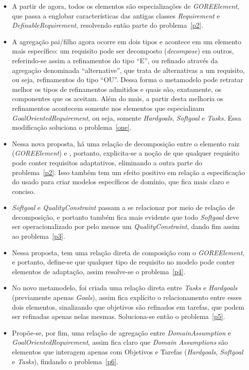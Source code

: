 \begin{itemize}
	\item A partir de agora, todos os elementos são especializações de \textit{GOREElement}, que passa a englobar características das antigas classes \textit{Requirement} e \textit{DefinableRequirement}, resolvendo então parte do problema~\ref{p2}. 

	\item A agregação pai/filho agora ocorre em dois tipos e acontece em um elemento mais específico: um requisito pode ser decomposto (\textit{decompose}) em outros, referindo-se assim a refinamentos do tipo ``E'', ou refinado através da agregação denominada ``alternative'', que trata de alternativas a um requisito, ou seja, refinamentos do tipo ``OU''. Dessa forma o metamodelo pode retratar melhor os tipos de refinamentos admitidos e quais são, exatamente, os componentes que  os aceitam. Além do mais, a partir desta melhoria os refinamentos acontecem somente nos elementos que especializam \textit{GoalOrientedRequirement}, ou seja, somente \textit{Hardgoals}, \textit{Softgoal} e \textit{Tasks}. Essa modificação soluciona o problema~\ref{one}.

	\item Nessa nova proposta, há uma relação de decomposição entre o elemento raiz (\textit{GOREElement}) e \awreq, portanto, explicita-se a noção de que qualquer requisito pode conter requisitos adaptativos, eliminando a outra parte do problema~\ref{p2}. Isso também tem um efeito positivo em relação a especificação do \xml usado para criar modelos específicos de domínio, que fica mais claro e conciso.
	
	\item \textit{Softgoal} e \textit{QualityConstraint} passam a se relacionar por meio de relação de decomposição, e portanto também fica mais evidente que todo \textit{Softgoal} deve ser operacionalizado por pelo menos um \textit{QualityConstraint}, dando fim assim ao problema~\ref{p3}.
	
	\item Nessa proposta, \awreqs tem uma relação direta de composição com o \textit{GOREElement}, e portanto, define-se que qualquer tipo de requisito no modelo pode conter elementos de adaptação, assim resolve-se o problema~\ref{p4}.
	
	\item No novo metamodelo, foi criada uma relação direta entre \textit{Tasks} e \textit{Hardgoals} (previamente apenas \textit{Goals}), assim fica explícito o relacionamento entre esses dois elementos, sinalizando que objetivos são refinados em tarefas, que podem ser refinadas apenas nelas mesmas. Soluciona-se então o problema~\ref{p5}.
	
	\item Propõe-se, por fim, uma relação de agregação entre \textit{DomainAssumption} e \textit{GoalOrientedRequirement}, assim fica claro que \textit{Domain Assumptions} são elementos que interagem apenas com Objetivos e Tarefas (\textit{Hardgoals}, \textit{Softgoal} e \textit{Tasks}), findando o problema~\ref{p6}.
	
\end{itemize}

